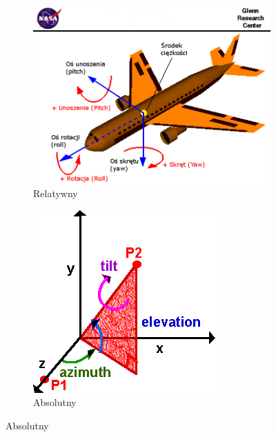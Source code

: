 \begin{savenotes}
	\begin{figure}[!htb]
		\captionsetup{singlelinecheck=off}
		\centering
		\begin{subfigure}[b]{0.63\textwidth}
			\centering
			\includegraphics[width=\textwidth]{images/nasaAircraft.png}	
			\caption[Kąty Eulera w relatywnym układzie współrzędnych]{Relatywny }
			\label{fig:appx:rot:eulerRel}
		\end{subfigure}
		\hfill																																						
		\begin{subfigure}[b]{0.35\textwidth}
			\centering
			\includegraphics[width=\textwidth]{images/eulerAbsolute.png}		
			\caption[Kąty Eulera w absolutnym układzie współrzędnych]{Absolutny }
			\label{fig:appx:rot:eulerAbs}
		\end{subfigure}
																																													

\end{figure}
\end{savenotes}
